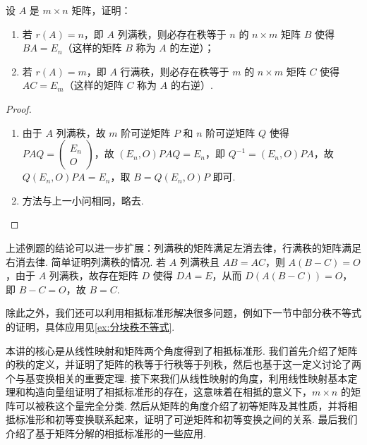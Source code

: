 \begin{example}{}{}
    设 $A$ 是 $m \times n$ 矩阵，证明：
    \begin{enumerate}
        \item 若 $r(A) = n$，即 $A$ 列满秩，则必存在秩等于 $n$ 的 $n \times m$ 矩阵 $B$ 使得 $BA = E_n$（这样的矩阵 $B$ 称为 $A$ 的左逆）；
        \item 若 $r(A) = m$，即 $A$ 行满秩，则必存在秩等于 $m$ 的 $n \times m$ 矩阵 $C$ 使得 $AC = E_m$（这样的矩阵 $C$ 称为 $A$ 的右逆）.
    \end{enumerate}
\end{example}

\begin{proof}
    \begin{enumerate}
        \item 由于 $A$ 列满秩，故 $m$ 阶可逆矩阵 $P$ 和 $n$ 阶可逆矩阵 $Q$ 使得 $PAQ = \begin{pmatrix}
                  E_n \\ O
              \end{pmatrix}$，故 $(E_n, O)PAQ = E_n$，即 $Q^{-1} = (E_n, O)PA$，故 $Q(E_n, O)PA = E_n$，取 $B = Q(E_n, O)P$ 即可.
        \item 方法与上一小问相同，略去.
    \end{enumerate}
\end{proof}

上述例题的结论可以进一步扩展：列满秩的矩阵满足左消去律，行满秩的矩阵满足右消去律. 简单证明列满秩的情况. 若 $A$ 列满秩且 $AB = AC$，则 $A(B - C) = O$，由于 $A$ 列满秩，故存在矩阵 $D$ 使得 $DA = E$，从而 $D(A(B - C)) = O$，即 $B - C = O$，故 $B = C$.

除此之外，我们还可以利用相抵标准形解决很多问题，例如下一节中部分秩不等式的证明，具体应用见\autoref{ex:分块秩不等式}.

\begin{summary}

    本讲的核心是从线性映射和矩阵两个角度得到了相抵标准形. 我们首先介绍了矩阵的秩的定义，并证明了矩阵的秩等于行秩等于列秩，然后也基于这一定义讨论了两个与基变换相关的重要定理. 接下来我们从线性映射的角度，利用线性映射基本定理和构造向量组证明了相抵标准形的存在，这意味着在相抵的意义下，$m\times n$ 的矩阵可以被秩这个量完全分类. 然后从矩阵的角度介绍了初等矩阵及其性质，并将相抵标准形和初等变换联系起来，证明了可逆矩阵和初等变换之间的关系. 最后我们介绍了基于矩阵分解的相抵标准形的一些应用.

\end{summary}

